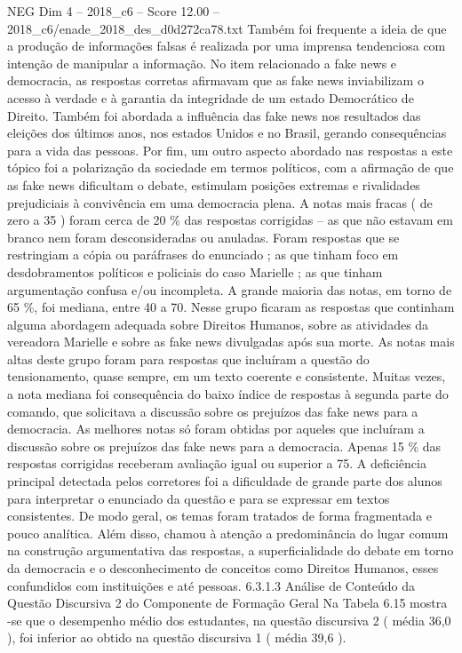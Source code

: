 \begin{textsample}{NEG Dim 4 – 2018\_c6 – Score 12.00 – 2018\_c6/enade\_2018\_des\_d0d272ca78.txt}
Também foi frequente a ideia de que a produção de informações falsas é realizada por uma imprensa tendenciosa com intenção de manipular a informação.
No item relacionado a fake news e democracia, as respostas corretas afirmavam que as fake news inviabilizam o acesso à verdade e à garantia da integridade de um estado Democrático de Direito.
Também foi abordada a influência das fake news nos resultados das eleições dos últimos anos, nos estados Unidos e no Brasil, gerando consequências para a vida das pessoas.
Por fim, um outro aspecto abordado nas respostas a este tópico foi a polarização da sociedade em termos políticos, com a afirmação de que as fake news dificultam o debate, estimulam posições extremas e rivalidades prejudiciais à convivência em uma democracia plena.
A notas mais fracas ( de zero a 35 ) foram cerca de 20 \% das respostas corrigidas – as que não estavam em branco nem foram desconsideradas ou anuladas.
Foram respostas que se restringiam a cópia ou paráfrases do enunciado ; as que tinham foco em desdobramentos políticos e policiais do caso Marielle ; as que tinham argumentação confusa e/ou incompleta.
A grande maioria das notas, em torno de 65 \%, foi mediana, entre 40 a 70.
Nesse grupo ficaram as respostas que continham alguma abordagem adequada sobre Direitos Humanos, sobre as atividades da vereadora Marielle e sobre as fake news divulgadas após sua morte.
As notas mais altas deste grupo foram para respostas que incluíram a questão do tensionamento, quase sempre, em um texto coerente e consistente.
Muitas vezes, a nota mediana foi consequência do baixo índice de respostas à segunda parte do comando, que solicitava a discussão sobre os prejuízos das fake news para a democracia.
As melhores notas só foram obtidas por aqueles que incluíram a discussão sobre os prejuízos das fake news para a democracia.
Apenas 15 \% das respostas corrigidas receberam avaliação igual ou superior a 75.
A deficiência principal detectada pelos corretores foi a dificuldade de grande parte dos alunos para interpretar o enunciado da questão e para se expressar em textos consistentes.
De modo geral, os temas foram tratados de forma fragmentada e pouco analítica.
Além disso, chamou à atenção a predominância do lugar comum na construção argumentativa das respostas, a superficialidade do debate em torno da democracia e o desconhecimento de conceitos como Direitos Humanos, esses confundidos com instituições e até pessoas. 6.3.1.3 Análise de Conteúdo da Questão Discursiva 2 do Componente de Formação Geral Na Tabela 6.15 mostra -se que o desempenho médio dos estudantes, na questão discursiva 2 ( média 36,0 ), foi inferior ao obtido na questão discursiva 1 ( média 39,6 ).

\end{textsample}
